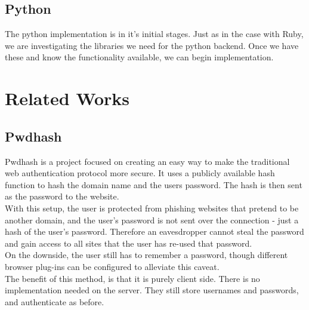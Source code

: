 \documentclass[11pt]{article}
\begin{document}
\subsection{Python} \label{subsec:python}
The python implementation is in it's initial stages. Just as in the case with Ruby, we are investigating the libraries we need for the python backend. Once we have these and know the functionality available, we can begin implementation.

\section{Related Works} \label{sec:relatedWorks}
\subsection{Pwdhash} 
Pwdhash\cite{pwdhash} is a project focused on creating an easy way to make the traditional web authentication protocol more secure. It uses a publicly available hash function to hash the domain name and the users password. The hash is then sent as the password to the website.\\
	With this setup, the user is protected from phishing websites that pretend to be another domain, and the user’s password is not sent over the connection - just a hash of the user's password. Therefore an eavesdropper cannot steal the password and gain access to all sites that the user has re-used that password.\\
	On the downside, the user still has to remember a password, though different browser plug-ins can be configured to alleviate this caveat.\\
The benefit of this method, is that it is purely client side. There is no implementation needed on the server. They still store usernames and passwords, and authenticate as before.
\end{document}
